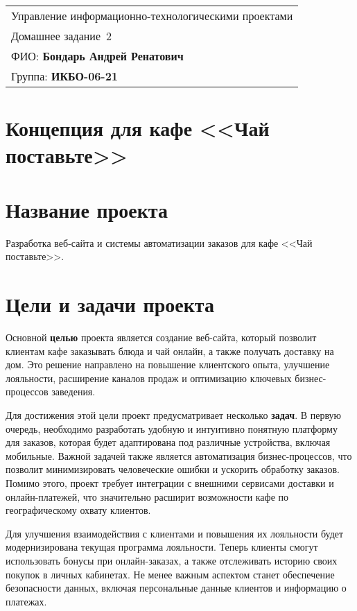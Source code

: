 \begin{tabular}{|l|}
	\hline
	Управление информационно-технологическими проектами \\
	Домашнее задание \No\,2 \\ \hline
	ФИО: \textbf{Бондарь Андрей Ренатович} \\ \hline
	Группа: \textbf{ИКБО-06-21} \\ \hline
\end{tabular}

\section*{Концепция для кафе <<Чай поставьте>>}

\section{Название проекта}

Разработка веб-сайта
и системы автоматизации заказов для кафе <<Чай поставьте>>.

\section{Цели и задачи проекта}

Основной \textbf{целью} проекта является создание веб-сайта,
который позволит клиентам кафе заказывать блюда и чай онлайн,
а также получать доставку на дом.
Это решение направлено на повышение клиентского опыта, улучшение лояльности,
расширение каналов продаж и оптимизацию ключевых бизнес-процессов заведения.

Для достижения этой цели проект предусматривает несколько \textbf{задач}. В первую очередь, необходимо разработать удобную и интуитивно понятную платформу для заказов, которая будет адаптирована под различные устройства, включая мобильные. Важной задачей также является автоматизация бизнес-процессов, что позволит минимизировать человеческие ошибки и ускорить обработку заказов. Помимо этого, проект требует интеграции с внешними сервисами доставки и онлайн-платежей, что значительно расширит возможности кафе по географическому охвату клиентов.

Для улучшения взаимодействия с клиентами и повышения их лояльности будет модернизирована текущая программа лояльности. Теперь клиенты смогут использовать бонусы при онлайн-заказах, а также отслеживать историю своих покупок в личных кабинетах. Не менее важным аспектом станет обеспечение безопасности данных, включая персональные данные клиентов и информацию о платежах.

